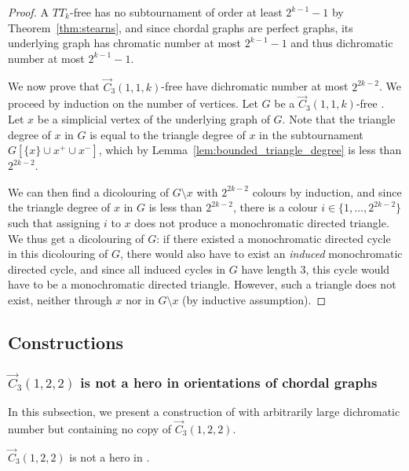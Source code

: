 \begin{proof}
A $TT_k$-free \ocg has no subtournament of order at least $2^{k-1}-1$ by Theorem~\ref{thm:stearns}, and since chordal graphs are perfect graphs, its underlying graph has chromatic number at most $2^{k-1}-1$ and thus dichromatic number at most $2^{k-1}-1$.

We now prove that $\vec C_{3}(1,1,k)$-free \ocgs have dichromatic number at most $2^{2k-2}$.  We proceed by induction on the number of vertices. 
Let $G$ be a $\vec C_{3}(1,1,k)$-free \ocg. Let $x$ be a simplicial vertex of the underlying graph of $G$.  Note that the triangle degree of $x$ in $G$ is equal to the triangle degree of $x$ in the subtournament $G[\{x\} \cup x^+ \cup x^-]$, which by Lemma~\ref{lem:bounded_triangle_degree} is less than $2^{2k-2}$.

We can then find a dicolouring of $G \setminus x$ with $2^{2k-2}$ colours by induction,  and since the triangle degree of $x$ in $G$ is less than $2^{2k-2}$, there is a colour $i \in \{1, \dots, 2^{2k-2}\}$ such that assigning $i$ to $x$ does not produce a monochromatic directed triangle. We thus get a dicolouring of $G$: if there existed a monochromatic directed cycle in this dicolouring of $G$, there would also have to exist an \emph{induced} monochromatic directed cycle, and since all induced cycles in $G$ have length $3$, this cycle would have to be a monochromatic directed triangle. However, such a triangle does not exist, neither through $x$ nor in $G\setminus x$ (by inductive assumption). 
\end{proof}


\subsection{Constructions} \label{sec:nonheroes}

\subsubsection{$\vec C_{3}(1,2,2)$ is not a hero in orientations of chordal graphs}\label{subsec:122}

In this subsection, we present a construction of \ocgs with arbitrarily large dichromatic number but containing no copy of $\vec C_{3}(1,2,2)$. %

\begin{theorem}\label{thm:ce_122}
$\vec C_{3}(1,2,2)$ is not a hero in \ocgs.
\end{theorem}

